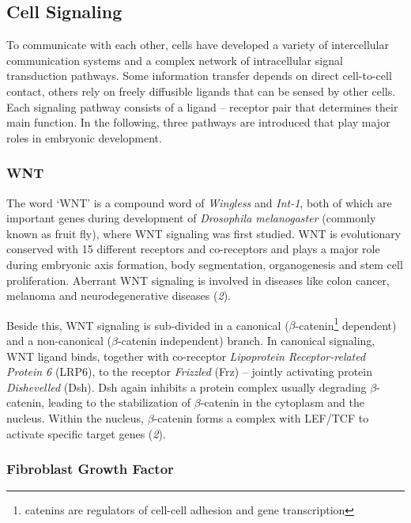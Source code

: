 \documentclass[10pt, b5paper, singlespacinge, twoside]{reedthesis} %
\theoremstyle{definition}
\theoremstyle{definition}
\theoremstyle{definition}
\theoremstyle{remark}
\begin{document}
\hypertarget{cell-signaling}{%
\subsection{Cell Signaling}\label{cell-signaling}}

To communicate with each other, cells have developed a variety of intercellular communication systems and a complex network of intracellular signal transduction pathways. Some information transfer depends on direct cell-to-cell contact, others rely on freely diffusible ligands that can be sensed by other cells. Each signaling pathway consists of a ligand -- receptor pair that determines their main function. In the following, three pathways are introduced that play major roles in embryonic development.

\hypertarget{wnt}{%
\subsubsection{WNT}\label{wnt}}

The word `WNT' is a compound word of \emph{Wingless} and \emph{Int-1}, both of which are important genes during development of \emph{Drosophila melanogaster} (commonly known as fruit fly), where WNT signaling was first studied. WNT is evolutionary conserved with 15 different receptors and co-receptors and plays a major role during embryonic axis formation, body segmentation, organogenesis and stem cell proliferation. Aberrant WNT signaling is involved in diseases like colon cancer, melanoma and neurodegenerative diseases (\emph{2}).

Beside this, WNT signaling is sub-divided in a canonical (\(\beta\)-catenin\footnote{catenins are regulators of cell-cell adhesion and gene transcription} dependent) and a non-canonical (\(\beta\)-catenin independent) branch. In canonical signaling, WNT ligand binds, together with co-receptor \emph{Lipoprotein Receptor-related Protein 6} (LRP6), to the receptor \emph{Frizzled} (Frz) -- jointly activating protein \emph{Dishevelled} (Dsh). Dsh again inhibits a protein complex usually degrading \(\beta\)-catenin, leading to the stabilization of \(\beta\)-catenin in the cytoplasm and the nucleus. Within the nucleus, \(\beta\)-catenin forms a complex with LEF/TCF to activate specific target genes (\emph{2}).

\hypertarget{intro-FGF}{%
\subsubsection{Fibroblast Growth Factor}\label{intro-FGF}}
\end{document}
